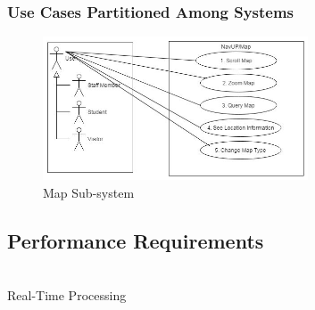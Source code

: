 \documentclass[runningheads,a4paper]{article}
\begin{document}
\subsubsection{Use Cases Partitioned Among Systems}
\begin{figure}[H]
   	\centering
   	\includegraphics[width=0.7\textwidth]{NavUP-Map-Subsystem.jpg}
   	\caption{Map Sub-system}
\end{figure}

\subsection{Performance Requirements}


\noindent \\ Real-Time Processing
\end{document}
